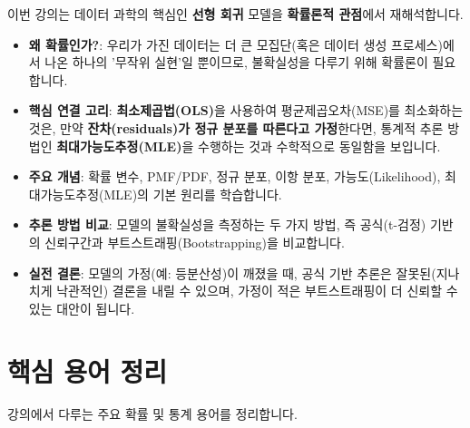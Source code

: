 \documentclass[11pt,a4paper]{book}
\theoremstyle{definition}
\begin{document}
\begin{tcolorbox}[colback=blue!5!white, colframe=blue!75!black, title={강의 핵심 요약}]
이번 강의는 데이터 과학의 핵심인 \textbf{선형 회귀} 모델을 \textbf{확률론적 관점}에서 재해석합니다.

\begin{itemize}
    \item \textbf{왜 확률인가?}: 우리가 가진 데이터는 더 큰 모집단(혹은 데이터 생성 프로세스)에서 나온 하나의 '무작위 실현'일 뿐이므로, 불확실성을 다루기 위해 확률론이 필요합니다.
    \item \textbf{핵심 연결 고리}: \textbf{최소제곱법(OLS)}을 사용하여 평균제곱오차(MSE)를 최소화하는 것은, 만약 \textbf{잔차(residuals)가 정규 분포를 따른다고 가정}한다면, 통계적 추론 방법인 \textbf{최대가능도추정(MLE)}을 수행하는 것과 수학적으로 동일함을 보입니다.
    \item \textbf{주요 개념}: 확률 변수, PMF/PDF, 정규 분포, 이항 분포, 가능도(Likelihood), 최대가능도추정(MLE)의 기본 원리를 학습합니다.
    \item \textbf{추론 방법 비교}: 모델의 불확실성을 측정하는 두 가지 방법, 즉 공식(t-검정) 기반의 신뢰구간과 부트스트래핑(Bootstrapping)을 비교합니다.
    \item \textbf{실전 결론}: 모델의 가정(예: 등분산성)이 깨졌을 때, 공식 기반 추론은 잘못된(지나치게 낙관적인) 결론을 내릴 수 있으며, 가정이 적은 부트스트래핑이 더 신뢰할 수 있는 대안이 됩니다.
\end{itemize}
\end{tcolorbox}


\part{핵심 용어 정리}
\label{part:terms}

강의에서 다루는 주요 확률 및 통계 용어를 정리합니다.
\end{document}
